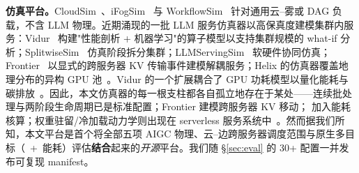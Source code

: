 \textbf{仿真平台。}CloudSim~\cite{calheiros2011cloudsim}、iFogSim~\cite{gupta2017ifogsim} 与 WorkflowSim~\cite{chen2012workflowsim} 针对通用云--雾或 DAG 负载，不含 LLM 物理。近期涌现的一批 LLM 服务仿真器以高保真度建模集群内服务：Vidur~\cite{agrawal2024vidur} 构建"性能剖析 + 机器学习"的算子模型以支持集群规模的 what-if 分析；SplitwiseSim~\cite{patel2024splitwise} 仿真阶段拆分集群；LLMServingSim~\cite{cho2024llmservingsim} 软硬件协同仿真；Frontier~\cite{frontier2025sim} 以显式的跨服务器 KV 传输事件建模解耦服务；Helix 的仿真器覆盖地理分布的异构 GPU 池~\cite{mei2025helix}。Vidur 的一个扩展耦合了 GPU 功耗模型以量化能耗与碳排放~\cite{wiesner2025vidurvessim}。因此，本文仿真器的每一根支柱都各自孤立地存在于某处——连续批处理与两阶段生命周期已是标准配置；Frontier 建模跨服务器 KV 移动；\cite{wiesner2025vidurvessim} 加入能耗核算；权重驻留/冷加载动力学则出现在 serverless 服务系统中~\cite{fu2024serverlessllm}。然而据我们所知，本文平台是首个将全部五项 AIGC 物理、云--边跨服务器调度范围与原生多目标（\slo{}~+~能耗）评估\textbf{结合}起来的\emph{开源}平台。我们随 \S\ref{sec:eval} 的 30+ 配置一并发布可复现 manifest。
